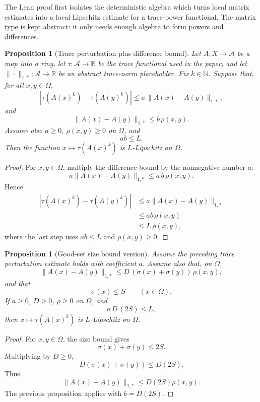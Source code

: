 \documentclass[11pt]{article}
\newtheorem{proposition}[theorem]{Proposition}
\newcommand{\R}{\mathbb{R}}
\newcommand{\OmegaGood}{\Omega}
\begin{document}
The Lean proof first isolates the deterministic algebra which turns local
matrix estimates into a local Lipschitz estimate for a trace-power functional.
The matrix type is kept abstract: it only needs enough algebra to form powers
and differences.

\begin{proposition}[Trace perturbation plus difference bound]
Let \(A:X\to\mathcal A\) be a map into a ring, let
\(\tau:\mathcal A\to\R\) be the trace functional used in the paper, and let
\(\|\cdot\|_{1,*}:\mathcal A\to\R\) be an abstract trace-norm placeholder.
Fix \(k\in\mathbb N\).  Suppose that, for all \(x,y\in\OmegaGood\),
\[
 |\tau(A(x)^k)-\tau(A(y)^k)|
   \le a\,\|A(x)-A(y)\|_{1,*},
\]
and
\[
 \|A(x)-A(y)\|_{1,*}\le b\,\rho(x,y).
\]
Assume also \(a\ge0\), \(\rho(x,y)\ge0\) on \(\OmegaGood\), and
\[
  ab\le L.
\]
Then the function \(x\mapsto \tau(A(x)^k)\) is \(L\)-Lipschitz on
\(\OmegaGood\).
\end{proposition}

\begin{proof}
For \(x,y\in\OmegaGood\), multiply the difference bound by the nonnegative
number \(a\):
\[
 a\|A(x)-A(y)\|_{1,*}\le a\,b\,\rho(x,y).
\]
Hence
\[
\begin{aligned}
 |\tau(A(x)^k)-\tau(A(y)^k)|
 &\le a\|A(x)-A(y)\|_{1,*} \\
 &\le ab\,\rho(x,y) \\
 &\le L\,\rho(x,y),
\end{aligned}
\]
where the last step uses \(ab\le L\) and \(\rho(x,y)\ge0\).
\end{proof}

\begin{proposition}[Good-set size bound version]
Assume the preceding trace perturbation estimate holds with coefficient
\(a\).  Assume also that, on \(\OmegaGood\),
\[
  \|A(x)-A(y)\|_{1,*}
     \le D\,(\sigma(x)+\sigma(y))\,\rho(x,y),
\]
and that
\[
  \sigma(x)\le S \qquad (x\in\OmegaGood).
\]
If \(a\ge0\), \(D\ge0\), \(\rho\ge0\) on \(\OmegaGood\), and
\[
  a\,D\,(2S)\le L,
\]
then \(x\mapsto \tau(A(x)^k)\) is \(L\)-Lipschitz on \(\OmegaGood\).
\end{proposition}

\begin{proof}
For \(x,y\in\OmegaGood\), the size bound gives
\[
  \sigma(x)+\sigma(y)\le 2S.
\]
Multiplying by \(D\ge0\),
\[
  D(\sigma(x)+\sigma(y))\le D(2S).
\]
Thus
\[
 \|A(x)-A(y)\|_{1,*}
    \le D(2S)\rho(x,y).
\]
The previous proposition applies with \(b=D(2S)\).
\end{proof}
\end{document}
